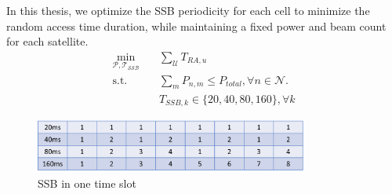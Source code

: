 In this thesis, we optimize the SSB periodicity for each cell to minimize the random access time duration, while maintaining a fixed power and beam count for each satellite.
\begin{align*}
    \min_{\mathcal{P}, \mathcal{T_{SSB}}} \quad & \sum_\mathcal{U} T_{RA,u} \\
    \text{s.t.} \quad & \sum_m P_{n,m} \leq P_{total}, \forall n \in \mathcal{N}. \\
    & T_{SSB, k}\in\{20, 40, 80, 160\}, \forall k
    \end{align*}
    \begin{figure}[h!]
        \centering
        \includegraphics[width=0.8\textwidth]{SSB.png}
        \caption{SSB in one time slot}
        \label{fig_SSB}
    \end{figure}
    

